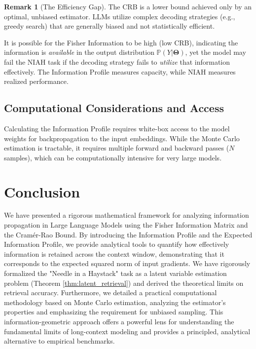 \documentclass{article}
\theoremstyle{definition}
\newtheorem{remark}[theorem]{Remark}
\begin{document}
\begin{remark}[The Efficiency Gap]
The CRB is a lower bound achieved only by an optimal, unbiased estimator. LLMs utilize complex decoding strategies (e.g., greedy search) that are generally biased and not statistically efficient.
\end{remark}

It is possible for the Fisher Information to be high (low CRB), indicating the information is \emph{available} in the output distribution $\mathbb{P}(Y|\mathbf{\Theta})$, yet the model may fail the NIAH task if the decoding strategy fails to \emph{utilize} that information effectively. The Information Profile measures capacity, while NIAH measures realized performance.

\subsection{Computational Considerations and Access}
Calculating the Information Profile requires white-box access to the model weights for backpropagation to the input embeddings. While the Monte Carlo estimation is tractable, it requires multiple forward and backward passes ($N$ samples), which can be computationally intensive for very large models.

\section{Conclusion}
We have presented a rigorous mathematical framework for analyzing information propagation in Large Language Models using the Fisher Information Matrix and the Cramér-Rao Bound. By introducing the Information Profile and the Expected Information Profile, we provide analytical tools to quantify how effectively information is retained across the context window, demonstrating that it corresponds to the expected squared norm of input gradients. We have rigorously formalized the "Needle in a Haystack" task as a latent variable estimation problem (Theorem \ref{thm:latent_retrieval}) and derived the theoretical limits on retrieval accuracy. Furthermore, we detailed a practical computational methodology based on Monte Carlo estimation, analyzing the estimator's properties and emphasizing the requirement for unbiased sampling. This information-geometric approach offers a powerful lens for understanding the fundamental limits of long-context modeling and provides a principled, analytical alternative to empirical benchmarks.
\end{document}
